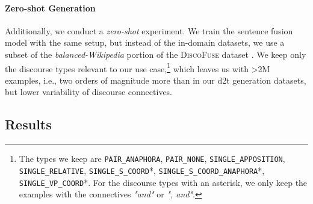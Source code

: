 \paragraph{Zero-shot Generation} Additionally, we conduct a \textit{zero-shot} experiment. We train the sentence fusion model with the same setup, but instead of the in-domain datasets, we use a subset of the \emph{balanced-Wikipedia} portion of the \textsc{DiscoFuse} dataset \cite{geva-etal-2019-discofuse}. We keep only the discourse types relevant to our use case,\footnote{The types we keep are \texttt{PAIR\_ANAPHORA}, \texttt{PAIR\_NONE}, \texttt{SINGLE\_APPOSITION}, \texttt{SINGLE\_RELATIVE}, \texttt{SINGLE\_S\_COORD}*, \texttt{SINGLE\_S\_COORD\_ANAPHORA}*, \texttt{SINGLE\_VP\_COORD}*. For the discourse types with an asterisk, we only keep the examples with the connectives \emph{"and"} or \emph{", and"}.} which leaves us with >2M examples, i.e., two orders of magnitude more than in our \ac{d2t} generation datasets, but lower variability of discourse connectives.


\subsection{Results}
\label{sec:iterative:results}

